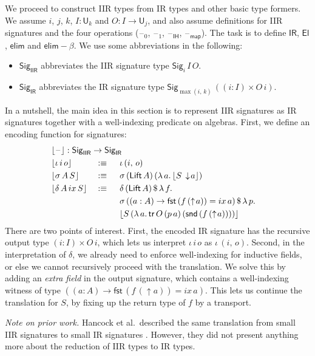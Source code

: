 \documentclass[acmsmall,screen,review,anonymous]{acmart}
\newcommand{\msf}[1]{{\mathsf{#1}}}
\newcommand{\U}{\msf{U}}
\newcommand{\El}{\msf{El}}
\newcommand{\Lift}{\msf{Lift}}
\newcommand{\lup}{\uparrow}
\newcommand{\ldown}{\downarrow}
\newcommand{\Sig}{\msf{Sig}}
\newcommand{\blank}{{\mathord{\hspace{1pt}\text{--}\hspace{1pt}}}}
\newcommand{\ix}{{ix}}
\newcommand{\IR}{\msf{IR}}
\newcommand{\IH}{\msf{IH}}
\newcommand{\map}{\msf{map}}
\newcommand{\elim}{\msf{elim}}
\newcommand{\tr}{\msf{tr}}
\newcommand{\fst}{\msf{fst}}
\newcommand{\snd}{\msf{snd}}
\newcommand{\IIR}{\msf{IIR}}
\newcommand{\Sigr}[1]{\lfloor #1 \rfloor}
\begin{document}
We proceed to construct IIR types from IR types and other basic type formers. We assume $i$, $j$,
$k$, $I : \U_k$ and $O : I \to \U_j$, and also assume definitions for IIR signatures and the four
operations ($\blank_0$, $\blank_1$, $\blank_\IH$, $\blank_\map$). The task is to define $\IR$,
$\El$, $\elim$ and $\elim\!-\!\!\beta$. We use some abbreviations in the following:
\begin{itemize}
\item $\Sig_\IIR$ abbreviates the IIR signature type $\Sig_i\,I\,O$.
\item $\Sig_\IR$ abbreviates the IR signature type $\Sig_{\max(i,\,k)}\,((i : I) \times O\,i)$.
\end{itemize}
In a nutshell, the main idea in this section is to represent IIR signatures as IR signatures
together with a well-indexing predicate on algebras. First, we define an encoding function for
signatures:
\begin{alignat*}{4}
  & \rlap{$\Sigr{\blank} : \Sig_\IIR \to \Sig_\IR$}\\
  & \Sigr{\iota\,i\,o}       &&:\equiv \hspace{0.5em} &&\iota\,(i,\,o)\\
  & \Sigr{\sigma\,A\,S}      &&:\equiv \hspace{0.5em} &&\sigma\,(\Lift\,A)\,(\lambda\,a.\,\Sigr{S\,\ldown\!a})\\
  & \Sigr{\delta\,A\,\ix\,S} &&:\equiv \hspace{0.5em} &&\delta\,(\Lift\,A)\,\$\,\lambda\,f.\\
  &  &&                                &&\sigma\,((a : A) \to \fst\,(f\,(\lup\!a)) = \ix\,a)\,\$\,\lambda\,p.\\
  &  &&                                &&\Sigr{S\,(\lambda\,a.\,\tr\,O\,(p\,a)\,(\snd\,(f\,(\lup\! a))))}
\end{alignat*}
There are two points of interest. First, the encoded IR signature has the recursive output type $(i
: I) \times O\,i$, which lets us interpret $\iota\,i\,o$ as $\iota\,(i,\,o)$. Second, in the
interpretation of $\delta$, we already need to enforce well-indexing for inductive fields, or else
we cannot recursively proceed with the translation. We solve this by adding an \emph{extra field} in
the output signature, which contains a well-indexing witness of type $((a : A) \to \fst\,(f\,(\lup\!a)) = \ix\,a)$.
This lets us continue the translation for $S$, by fixing up the return type of $f$ by a transport.

\emph{Note on prior work.} Hancock et al.\ described the same translation from small IIR
signatures to small IR signatures \cite{TODO}. However, they did not present anything more about the
reduction of IIR types to IR types.
\end{document}
